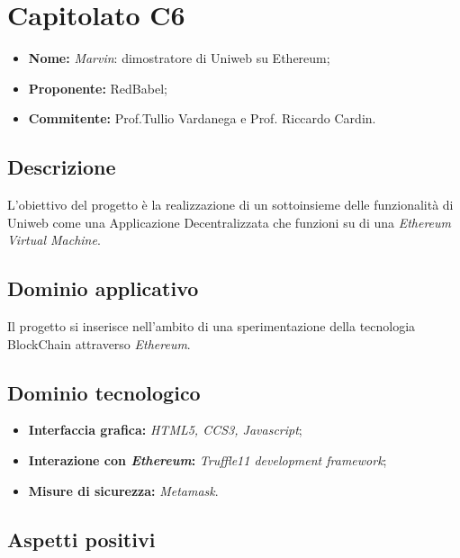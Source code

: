 \documentclass[openany,12pt,a4paper]{report}
\begin{document}

	\section{Capitolato C6}

	\begin{itemize}
		\item \textbf{Nome:} \textit{Marvin}: dimostratore di Uniweb su Ethereum;
		\item \textbf{Proponente:} RedBabel;
		\item \textbf{Commitente:} Prof.Tullio Vardanega e Prof. Riccardo Cardin.
	\end{itemize}

	\subsection{Descrizione}

	L'obiettivo del progetto è la realizzazione di un sottoinsieme delle funzionalità di Uniweb come una Applicazione Decentralizzata che funzioni su di una \textit{Ethereum Virtual Machine}.

	\subsection{Dominio applicativo}

	Il progetto si inserisce nell'ambito di una sperimentazione della tecnologia BlockChain attraverso \textit{Ethereum}.

	\subsection{Dominio tecnologico}

	\begin{itemize}
		\item \textbf{Interfaccia grafica:} \textit{HTML5, CCS3, Javascript};

		\item \textbf{Interazione con \textit{Ethereum}:} \textit{Truffle11 development framework};

		\item \textbf{Misure di sicurezza:} \textit{Metamask}.
	\end{itemize}

	\subsection{Aspetti positivi}
\end{document}
